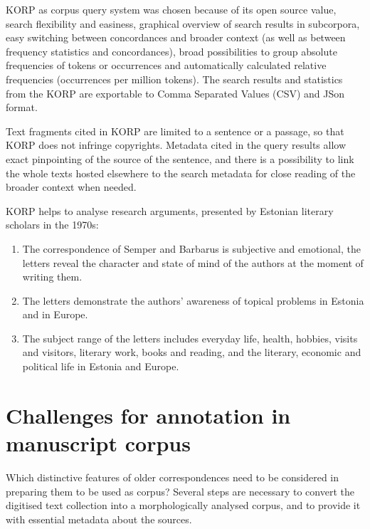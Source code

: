 \documentclass[runningheads]{llncs}
\begin{document}
KORP as corpus query system was chosen because of its open source value, search flexibility and easiness, graphical overview of search results in subcorpora, easy switching between concordances and broader context (as well as between frequency statistics and concordances), broad possibilities to group absolute frequencies of tokens or occurrences and automatically calculated relative frequencies (occurrences per million tokens).  The search results and statistics from the KORP are exportable to Comma Separated Values (CSV) and JSon format. 

Text fragments cited in KORP are limited to a sentence or a passage, so that KORP does not infringe copyrights. Metadata cited in the query results allow exact pinpointing of the source of the sentence, and there is a possibility to link the whole texts hosted elsewhere to the search metadata for close reading of the broader context when needed. 

KORP helps to analyse research arguments, presented by Estonian literary scholars in the 1970s:
\begin{enumerate}
\item The correspondence of Semper and Barbarus is subjective and emotional, the letters reveal the character and state of mind of the authors at the moment of writing them.

\item The letters demonstrate the authors’ awareness of topical problems in Estonia and in Europe.

\item The subject range of the letters includes everyday life, health, hobbies, visits and visitors, literary work, books and reading, and the literary, economic and political life in Estonia and Europe.
\end{enumerate}

\section{Challenges for annotation in manuscript corpus}

Which distinctive features of older correspondences need to be considered in preparing them to be used as corpus? Several steps are necessary to convert the digitised text collection into a morphologically analysed corpus, and to provide it with essential metadata about the sources.
\end{document}
